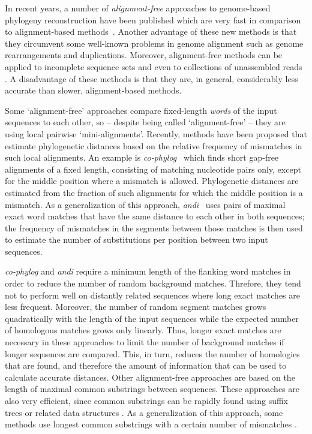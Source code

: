 \documentclass[review]{elsarticle}
\begin{document}
In recent years, a number of \textit{alignment-free} approaches to genome-based phylogeny reconstruction have been published which are very fast in comparison to alignment-based methods~\cite{son:ren:rei:etal:14,zie:vin:alm:kar:17,ber:cha:rag:16,bro:gri:otw:16,piz:16,ren:bai:you:etal:18}. 
Another advantage of these new methods is that they circumvent some  well-known problems in genome alignment such as genome rearrangements and duplications. Moreover, alignment-free methods can be applied 
to incomplete sequence sets and even to collections of unassembled reads \cite{roy:vis:bha:13,son:ren:zha:etal:13,yi:jin:13,com:sch:14}.
 A disadvantage of these methods is that they are, in general, considerably less accurate than slower, alignment-based methods. 


Some `alignment-free' approaches compare fixed-length {\em words} of the input sequences to each other, so   
-- despite being called `alignment-free' -- they are using local pairwise `mini-alignments'.  
Recently, methods have been proposed that estimate phylogenetic distances based on the relative frequency of mismatches in such local alignments.  
An example is \textit{co-phylog}~\cite{yi:jin:13} which finds short gap-free alignments of a fixed length, consisting of matching nucleotide pairs only, except for the middle position where a mismatch is allowed.  
Phylogenetic distances are estimated from the fraction of such alignments for which the middle position is a mismatch. As a generalization of this approach, \textit{andi}~\cite{hau:klo:pfa:14} uses pairs of maximal exact word matches that have the same distance to each other in both sequences; the frequency  of mismatches in the segments between those matches is then used to  estimate the number of substitutions per position between two input sequences. 

{\em co-phylog} and {\em andi} require a minimum length of the flanking word matches in order to reduce the number of random background matches. Threfore, they tend not to perform well on distantly related sequences where long exact matches are less frequent. 
%
Moreover, the number of random segment matches grows quadratically with the length of the input sequences while the expected number of homologous matches grows only linearly. Thus, longer exact matches are necessary in these approaches to limit the number of background matches if longer sequences are compared. This, in turn, reduces the number of {homologies} that are found, and therefore the amount of information that can be used to calculate accurate distances.
%
Other alignment-free approaches are based on the length of maximal common substrings between sequences. These approaches are also very efficient, since  common substrings can be rapidly found using suffix trees or related data structures \cite{uli:bur:tul:cho:06,hau:pfa:dom:wie:09}.  As a generalization of this approach, some methods use longest common substrings with a certain number of mismatches \cite{lei:mor:14,tha:apo:alu:16,tha:cho:liu:etal:17,mor:sch:lei:17,aya:cha:ili:pis:18}. 
\end{document}

